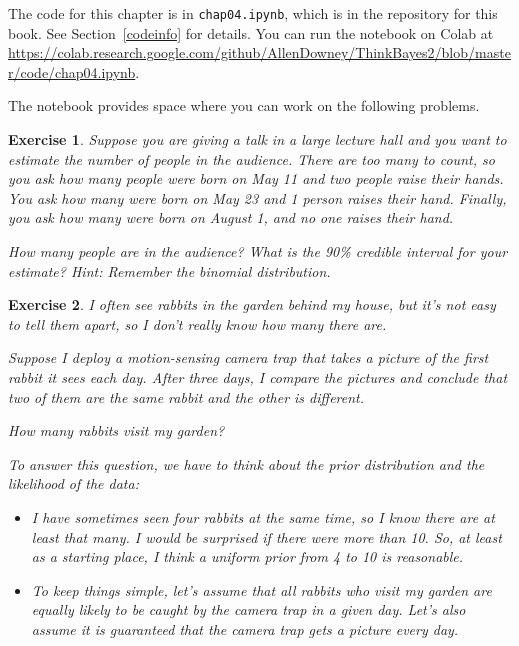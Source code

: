 \documentclass[12pt]{book}
\theoremstyle{exercise}
\newtheorem{exercise}{Exercise}[chapter]
\newcommand{\py}[1]{{\tt #1}}%
\begin{document}
The code for this chapter is in \py{chap04.ipynb}, which is in the repository for this book.  See Section~\ref{codeinfo} for details.
You can run the notebook on Colab at \url{https://colab.research.google.com/github/AllenDowney/ThinkBayes2/blob/master/code/chap04.ipynb}.

The notebook provides space where you can work on the following problems.


\begin{exercise}
Suppose you are giving a talk in a large lecture hall and you want to estimate the number of people in the audience.  There are too many to count, so you ask how many people were born on May 11 and two people raise their hands.  You ask how many were born on May 23 and 1 person raises their hand.  Finally, you ask how many were born on August 1, and no one raises their hand.

How many people are in the audience?  What is the 90\% credible interval for your estimate?  Hint: Remember the binomial distribution.
\end{exercise}


\begin{exercise}
I often see rabbits in the garden behind my house, but it's not easy to tell them apart, so I don't really know how many there are.

Suppose I deploy a motion-sensing camera trap that takes a picture of the first rabbit it sees each day.  After three days, I compare the pictures and conclude that two of them are the same rabbit and the other is different.

How many rabbits visit my garden?

To answer this question, we have to think about the prior distribution and the likelihood of the data:

\begin{itemize}

\item I have sometimes seen four rabbits at the same time, so I know there are at least that many.  I would be surprised if there were more than 10.  So, at least as a starting place, I think a uniform prior from 4 to 10 is reasonable.

\item To keep things simple, let's assume that all rabbits who visit my garden are equally likely to be caught by the camera trap in a given day.  Let's also assume it is guaranteed that the camera trap gets a picture every day.

\end{itemize}

\end{exercise}
\end{document}
